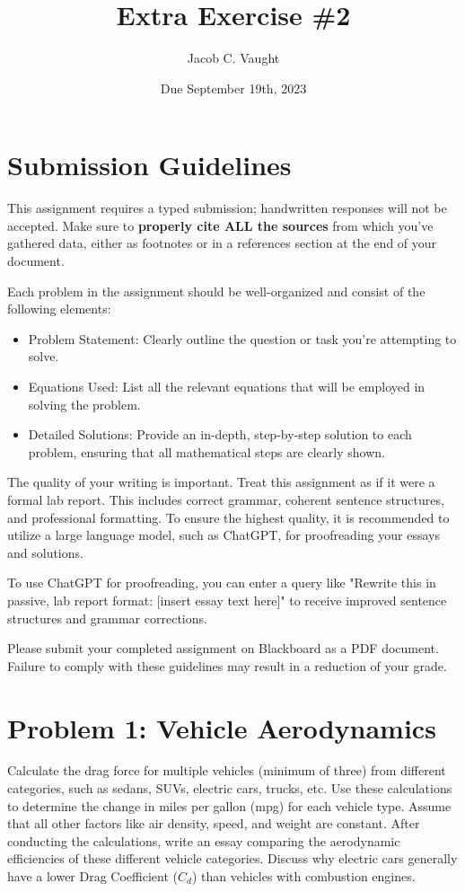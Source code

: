\documentclass[12pt]{article}
\title{Extra Exercise \#2}
\author{Jacob C. Vaught}
\date{Due September 19th, 2023}
\begin{document}
\maketitle

\section*{Submission Guidelines}

This assignment requires a typed submission; handwritten responses will not be accepted. Make sure to \textbf{properly cite ALL the sources} from which you've gathered data, either as footnotes or in a references section at the end of your document.
\newline

Each problem in the assignment should be well-organized and consist of the following elements:

\begin{itemize}
  \item Problem Statement: Clearly outline the question or task you're attempting to solve.
  \item Equations Used: List all the relevant equations that will be employed in solving the problem.
  \item Detailed Solutions: Provide an in-depth, step-by-step solution to each problem, ensuring that all mathematical steps are clearly shown.
\end{itemize}

The quality of your writing is important. Treat this assignment as if it were a formal lab report. This includes correct grammar, coherent sentence structures, and professional formatting. To ensure the highest quality, it is recommended to utilize a large language model, such as ChatGPT, for proofreading your essays and solutions.
\newline

To use ChatGPT for proofreading, you can enter a query like "Rewrite this in passive, lab report format: [insert essay text here]" to receive improved sentence structures and grammar corrections.
\newline

Please submit your completed assignment on Blackboard as a PDF document. Failure to comply with these guidelines may result in a reduction of your grade.

\newpage
\section*{Problem 1: Vehicle Aerodynamics}
Calculate the drag force for multiple vehicles (minimum of three) from different categories, such as sedans, SUVs, electric cars, trucks, etc. Use these calculations to determine the change in miles per gallon (mpg) for each vehicle type. Assume that all other factors like air density, speed, and weight are constant. After conducting the calculations, write an essay comparing the aerodynamic efficiencies of these different vehicle categories. Discuss why electric cars generally have a lower Drag Coefficient (\(C_d\)) than vehicles with combustion engines.
\end{document}
